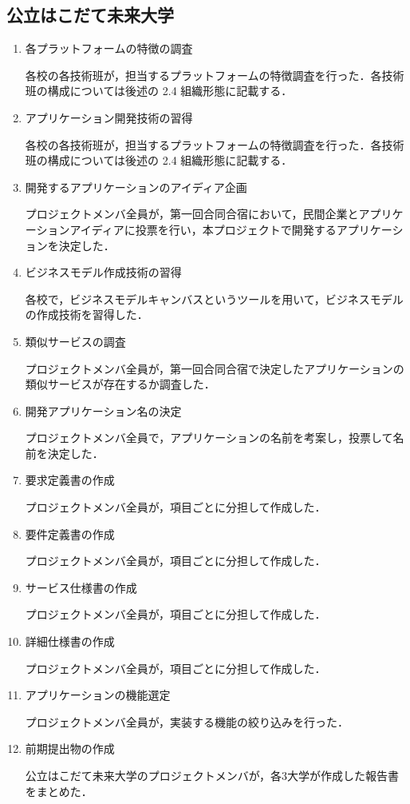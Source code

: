 \subsection{公立はこだて未来大学}
\begin{enumerate}
\item 各プラットフォームの特徴の調査
\par 各校の各技術班が，担当するプラットフォームの特徴調査を行った．各技術班の構成については後述の 2.4 組織形態に記載する．
\item アプリケーション開発技術の習得 
\par 各校の各技術班が，担当するプラットフォームの特徴調査を行った．各技術班の構成については後述の 2.4 組織形態に記載する．
\item 開発するアプリケーションのアイディア企画
\par プロジェクトメンバ全員が，第一回合同合宿において，民間企業とアプリケーションアイディアに投票を行い，本プロジェクトで開発するアプリケーションを決定した．
\item ビジネスモデル作成技術の習得
\par 各校で，ビジネスモデルキャンバスというツールを用いて，ビジネスモデルの作成技術を習得した．
\item 類似サービスの調査
\par プロジェクトメンバ全員が，第一回合同合宿で決定したアプリケーションの類似サービスが存在するか調査した．
\item 開発アプリケーション名の決定
\par プロジェクトメンバ全員で，アプリケーションの名前を考案し，投票して名前を決定した．
\item 要求定義書の作成
\par プロジェクトメンバ全員が，項目ごとに分担して作成した．
\item 要件定義書の作成
\par プロジェクトメンバ全員が，項目ごとに分担して作成した．
\item サービス仕様書の作成
\par プロジェクトメンバ全員が，項目ごとに分担して作成した．
\item 詳細仕様書の作成
\par プロジェクトメンバ全員が，項目ごとに分担して作成した．
\item アプリケーションの機能選定
\par プロジェクトメンバ全員が，実装する機能の絞り込みを行った．
\item  前期提出物の作成
\par 公立はこだて未来大学のプロジェクトメンバが，各3大学が作成した報告書をまとめた．
\end{enumerate}

